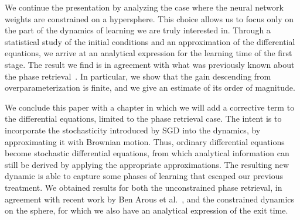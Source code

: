 We continue the presentation by analyzing the case where the neural network weights are constrained on a hypersphere.
This choice allows us to focus only on the part of the dynamics of learning we are truly interested in.
Through a statistical study of the initial conditions and an approximation of the differential equations,
we arrive at an analytical expression for the learning time of the first stage.
The result we find is in agreement with what was previously known about the phase retrieval~\cite{arous2021online}.
In particular, we show that the gain descending from overparameterization is finite,
and we give an estimate of its order of magnitude.

We conclude this paper with a chapter in which we will add a corrective term to the differential equations,
limited to the phase retrieval case.
The intent is to incorporate the stochasticity introduced by SGD into the dynamics, by approximating it with Brownian motion.
Thus, ordinary differential equations become stochastic differential equations,
from which analytical information can still be derived by applying the appropriate approximations.
The resulting new dynamic is able to capture some phases of learning that escaped our previous treatment.
We obtained results for both the unconstrained phase retrieval, in agreement with recent work by Ben Arous et al.~\cite{arous2022high},
and the constrained dynamics on the sphere, for which we also have an analytical expression of the exit time.
